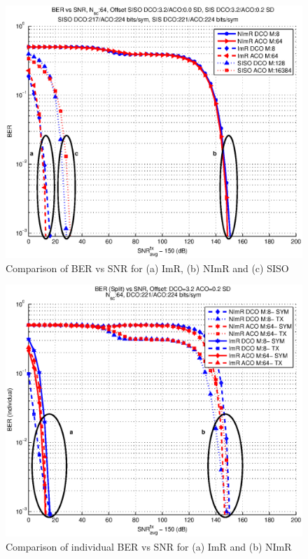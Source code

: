 \documentclass[12pt,letterpaper,onecolumn]{article} %
\begin{document}
\newpage
\begin{figure}[htp]
	\centering
		\includegraphics[trim={0.45in 0.15in 0.7in 0.00in}, clip=false, width=5in]{fig_35_64_all.eps}
	\caption{Comparison of BER vs SNR for (a) ImR, (b) NImR and (c) SISO}
\end{figure}

\newpage
\begin{figure}[htp]
	\centering
		\includegraphics[trim={0.45in 0.15in 0.7in 0.00in}, clip=false, width=5in]{fig_35_64_all_s.eps}
	\caption{Comparison of individual BER vs SNR for (a) ImR and (b) NImR}
\end{figure}
\end{document}
